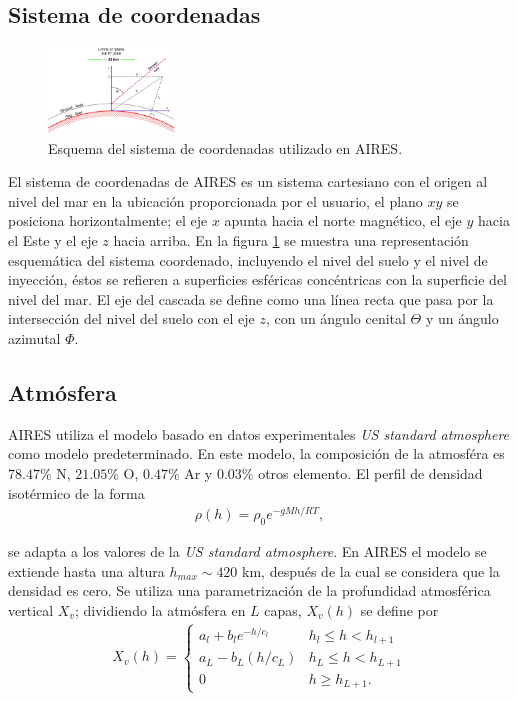 	\subsection{Sistema de coordenadas}
	\begin{figure}
	\includegraphics[width=0.3\textwidth]{Figuras/coordinates} 
	\caption{Esquema del sistema de coordenadas utilizado en AIRES.}
	\label{fig:coordinates}
	\end{figure}		
	El sistema de coordenadas de AIRES es un sistema cartesiano con el origen al nivel del mar en la ubicación proporcionada por el usuario, el plano $xy$ se posiciona horizontalmente; el eje $x$ apunta hacia el norte magnético, el eje $y$ hacia el Este y el eje $z$ hacia arriba. En la figura \ref{fig:coordinates} se muestra una representación esquemática del sistema coordenado, incluyendo el nivel del suelo y el nivel de inyección, éstos se refieren a superficies esféricas concéntricas con la superficie del nivel del mar. El eje del cascada se define como una línea recta que pasa por la intersección del nivel del suelo con el eje $z$, con un ángulo cenital $\Theta$ y un ángulo azimutal $\Phi$.
	
	\subsection{Atmósfera}
	AIRES utiliza el modelo basado en datos experimentales \textit{US standard atmosphere} como modelo predeterminado. En este modelo, la composición de la atmosféra es $78.47\%$ N, $21.05\%$ O, $0.47\%$ Ar y $0.03\%$ otros elemento. El perfil de densidad isotérmico de la forma
	\begin{align*}
	\rho (h) = \rho_0 e^{-gMh/RT},
	\end{align*}
	
	se adapta a los valores de la \textit{US standard atmosphere}. En AIRES el modelo se extiende hasta una altura $h_{max} \sim 420$ km, después de la cual se considera que la densidad es cero. Se utiliza una parametrización de la profundidad atmosférica vertical $X_v$; dividiendo la atmósfera en $L$ capas, $X_v (h)$ se define por 
	\begin{align}
	X_v (h) = \begin{cases}
	a_l + b_l e^{-h/c_l} & h_l \leq h < h_{l+1} \\
	a_L - b_L (h/c_L) & h_L \leq h < h_{L+1} \\
	0 & h \geq h_{L+1}.
	\end{cases}
	\end{align}
	
